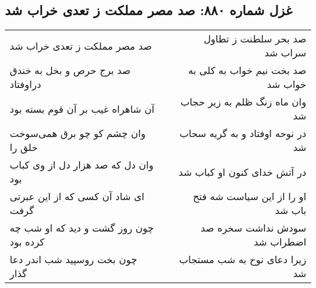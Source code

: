 \begin{center}
\section*{غزل شماره ۸۸۰: صد مصر مملکت ز تعدی خراب شد}
\label{sec:0880}
\begin{longtable}{l p{0.5cm} r}
صد مصر مملکت ز تعدی خراب شد
&&
صد بحر سلطنت ز تطاول سراب شد
\\
صد برج حرص و بخل به خندق دراوفتاد
&&
صد بخت نیم خواب به کلی به خواب شد
\\
آن شاهراه غیب بر آن قوم بسته بود
&&
وان ماه زنگ ظلم به زیر حجاب شد
\\
وان چشم کو چو برق همی‌سوخت خلق را
&&
در نوحه اوفتاد و به گریه سحاب شد
\\
وان دل که صد هزار دل از وی کباب بود
&&
در آتش خدای کنون او کباب شد
\\
ای شاد آن کسی که از این عبرتی گرفت
&&
او را از این سیاست شه فتح باب شد
\\
چون روز گشت و دید که او شب چه کرده بود
&&
سودش نداشت سخره صد اضطراب شد
\\
چون بخت روسپید شب اندر دعا گذار
&&
زیرا دعای نوح به شب مستجاب شد
\\
\end{longtable}
\end{center}
